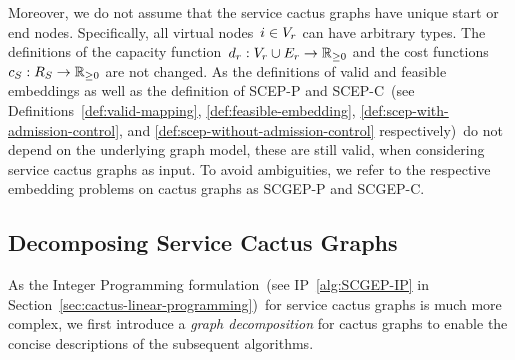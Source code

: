 \documentclass[10pt, conference, letterpaper]{IEEEtran}
\begin{document}
Moreover, we do not assume that the service cactus graphs have unique start or end nodes. Specifically, all virtual nodes~$i \in V_{r}$ can have arbitrary types. The definitions of the capacity function~$d_{r} : V_{r} \cup E_{r} \to \mathbb{R}_{\geq 0}$ and the cost functions~$c_{S}: R_{S} \to \mathbb{R}_{\geq 0}$ are not changed. As the definitions of valid and feasible embeddings as well as the definition of SCEP-P and SCEP-C~(see Definitions~\ref{def:valid-mapping}, \ref{def:feasible-embedding}, \ref{def:scep-with-admission-control}, and \ref{def:scep-without-admission-control} respectively)~do not depend on the underlying graph model, these are still valid, when considering service cactus graphs as input. To avoid ambiguities, we refer to the respective embedding 
problems on cactus graphs as SCGEP-P and SCGEP-C.

\begin{comment}
It must be noted that the requirement 1)~of Definition~\ref{def:service-cacti-graphs} is a technical one as our preprocessing also considers undirected versions of the underlying directed service cactus graph: the oppositely oriented edges $(u,v), (v,u) \in  \VE$ would yield the same undirected edge $\{u,v\}$. To model the cycle $(u,v), (v,u) \in  \VE$, one may use the following graph construction: (1)~add one additional ``dummy'' node $u'$ to $\VV$ having the same type as $u$ but no resource requirements, (2)~replace the edge $(u,v)$ by the edges $(u,u'), (u',v)$ where $(u,u')$ has infinite bandwidth demand while $(u',v)$ has the demand as the previous edge $(u,v)$. According to this construction the resource requirements are the same, while by posing an infinite bandwidth demand on $(u,u')$ functions $u$ and $u'$ must be mapped on the same node. Hence, the service graph depicted in Figure~\ref{fig:service-chain-example} can indeed be embedded using our approach presented henceforth.
\end{comment}


\subsection{Decomposing Service Cactus Graphs}
\label{sec:cactus:decomposing-service-graphs}

As the Integer Programming formulation~(see IP~\ref{alg:SCGEP-IP} in Section~\ref{sec:cactus-linear-programming})~for service cactus graphs is much more complex, we first introduce a \emph{graph decomposition} for cactus graphs to enable the concise descriptions of the subsequent algorithms.
\end{document}
